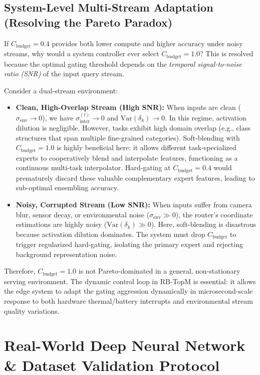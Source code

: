 \documentclass{article}
\theoremstyle{plain}
\theoremstyle{definition}
\theoremstyle{remark}
\begin{document}
\subsection{System-Level Multi-Stream Adaptation (Resolving the Pareto Paradox)}
If $C_{\text{budget}} = 0.4$ provides both lower compute and higher accuracy under noisy streams, why would a system controller ever select $C_{\text{budget}} = 1.0$? This is resolved because the optimal gating threshold depends on the \emph{temporal signal-to-noise ratio (SNR)} of the input query stream. 

Consider a dual-stream environment:
\begin{itemize}
    \item \textbf{Clean, High-Overlap Stream (High SNR):} When inputs are clean ($\sigma_{\text{env}} \to 0$), we have $\sigma_{\text{inter}}^{(l)} \to 0$ and $\text{Var}(\delta_k) \to 0$. In this regime, activation dilution is negligible. However, tasks exhibit high domain overlap (e.g., class structures that span multiple fine-grained categories). Soft-blending with $C_{\text{budget}} = 1.0$ is highly beneficial here: it allows different task-specialized experts to cooperatively blend and interpolate features, functioning as a continuous multi-task interpolator. Hard-gating at $C_{\text{budget}} = 0.4$ would prematurely discard these valuable complementary expert features, leading to sub-optimal ensembling accuracy.
    \item \textbf{Noisy, Corrupted Stream (Low SNR):} When inputs suffer from camera blur, sensor decay, or environmental noise ($\sigma_{\text{env}} \gg 0$), the router's coordinate estimations are highly noisy ($\text{Var}(\delta_k) \gg 0$). Here, soft-blending is disastrous because activation dilution dominates. The system must drop $C_{\text{budget}}$ to trigger regularized hard-gating, isolating the primary expert and rejecting background representation noise.
\end{itemize}

Therefore, $C_{\text{budget}} = 1.0$ is not Pareto-dominated in a general, non-stationary serving environment. The dynamic control loop in RB-TopM is essential: it allows the edge system to adapt the gating aggression dynamically in microsecond-scale response to both hardware thermal/battery interrupts and environmental stream quality variations.

\section{Real-World Deep Neural Network \& Dataset Validation Protocol}
\label{app:real_world_validation}
\end{document}
